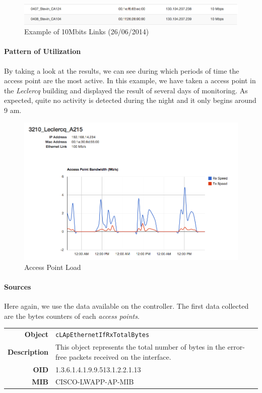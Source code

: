 \begin{figure}[H]
   \includegraphics[width=\textwidth]{Pictures/chapter5/slowLinks.png}
   \caption{Example of 10Mbits Links (26/06/2014)}
\end{figure}

\paragraph*{Pattern of Utilization} By taking a look at the results, we can see during which periods of time the access point are the most active. In this example, we have taken a access point in the \emph{Leclercq} building and displayed the result of several days of monitoring. As expected, quite no activity is detected during the night and it only begins around 9 am. 

\begin{figure}[H]
   \includegraphics[width=\textwidth]{Pictures/chapter5/apLoad.png}
   \caption{Access Point Load}
\end{figure}

\paragraph*{Sources} Here again, we use the data available on the controller. The first data collected are the bytes counters of each \emph{access points}.

\begin{tabular}{|r l|}
\hline
\textbf{Object} & \texttt{cLApEthernetIfRxTotalBytes} \\
\textbf{Description} & \parbox{11cm}{This object represents the total number of bytes in the error-free packets received on the interface.} \\
\textbf{OID} & 1.3.6.1.4.1.9.9.513.1.2.2.1.13 \\
\textbf{MIB} & CISCO-LWAPP-AP-MIB \\
\hline
\end{tabular}

